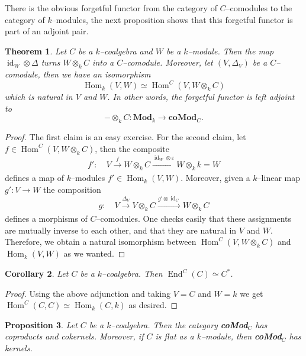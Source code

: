 \documentclass{article}
\theoremstyle{plain}
\newtheorem{Th}{Theorem}[section]
\newtheorem{Cor}[Th]{Corollary}
\newtheorem{Prop}[Th]{Proposition}
\theoremstyle{definition}
\DeclareMathOperator{\id}{id}
\DeclareMathOperator{\Hom}{Hom}
\DeclareMathOperator{\End}{End}
\begin{document}
There is the obvious forgetful functor from the category of $C$--comodules to the category of $k$--modules, the next proposition shows that this forgetful functor is part of an adjoint pair.

\begin{Th}\label{adjunction}
    Let $C$ be a $k$--coalgebra and $W$ be a $k$--module. Then the map $\id_W \otimes \Delta$ turns $W\otimes_k C$ into  a $C$--comodule. Moreover, let $(V, \Delta_V)$ be a $C$--comodule, then we have an isomorphism 
    \[
    \Hom_k(V, W)\simeq \Hom^C(V, W\otimes_k C)
    \]
    which is natural in $V$ and $W$. In other words, the forgetful functor is left adjoint to 
    \[
    -\otimes_k C\colon \mathbf{Mod}_k\to  \mathbf{coMod}_C.
    \]
\end{Th}

\begin{proof}
    The first claim is an easy exercise. For the second claim, let $f\in \Hom^C(V, W\otimes_k C)$, then the composite 
    \[
    f' \colon\quad V\xrightarrow[]{f} W\otimes_k C \xrightarrow[]{\id_W \otimes \varepsilon} W\otimes_k k=W
    \]
    defines a map of $k$--modules $f'\in \Hom_{k}(V, W)$. Moreover, given a $k$--linear map  $g'\colon V\to W$ the composition  
    \[
    g\colon \quad V\xrightarrow[]{\Delta_V} V\otimes_k C\xrightarrow[]{g'\otimes \id_C} W\otimes_k C
    \]
    defines a morphisms of $C$--comodules. One checks easily that these assignments are mutually inverse to each other, and that they are natural in $V$ and $W$. Therefore, we obtain a natural isomorphism between  $\Hom^C(V, W\otimes_k C)$ and  $\Hom_k(V, W)$ as we wanted. 
\end{proof}

\begin{Cor}
    Let $C$ be a $k$--coalgebra. Then $\End^C(C)\simeq C^*$.
\end{Cor}

\begin{proof}
    Using the above adjunction and taking $V=C$ and $W=k$ we get $\Hom^C(C, C)\simeq \Hom_k(C, k)$ as desired.
\end{proof}

\begin{Prop}\label{kernels}
    Let ${C}$ be a $k$--coalgebra. Then the category \emph{\textbf{coMod}}$_C$ has coproducts and cokernels. Moreover, if $C$ is flat as a $k$--module, then \emph{\textbf{coMod}}$_C$ has kernels.
\end{Prop}
\end{document}
